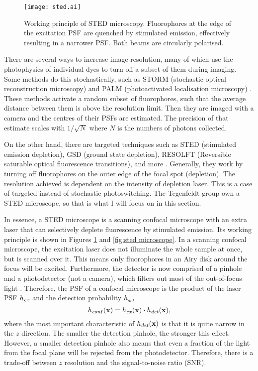 \begin{figure}
	\centering
	\texttt{[image: sted.ai]}
	\caption{
		Working principle of STED microscopy. Fluorophores at the edge of the excitation PSF are quenched by stimulated emission, effectively resulting in a narrower PSF. Both beams are circularly polarised. 
	}
	\label{fig:sted principle}
\end{figure}

There are several ways to increase image resolution, many of which use the photophysics of individual dyes to turn off a subset of them during imaging. Some methods do this stochastically, such as STORM (stochastic optical reconstruction microscopy) and PALM (photoactivated localisation microscopy) \cite{Mock2009, Betzig2006}. These methods activate a random subset of fluorophores, such that the average distance between them is above the resolution limit. Then they are imaged with a camera and the centres of their PSFs are estimated. The precision of that estimate scales with $ 1/\sqrt{N} $ where $ N $ is the numbers of photons collected.

On the other hand, there are targeted techniques such as STED (stimulated emission depletion), GSD (ground state depletion), RESOLFT (Reversible saturable optical fluorescence transitions), and more \cite{Klar2000, Folling2008, Hofmann2005}. Generally, they work by turning off fluorophores on the outer edge of the focal spot (depletion). The resolution achieved is dependent on the intensity of depletion laser. This is a case of targeted instead of stochastic photoswitching. The Tegenfeldt group own a STED microscope, so that is what I will focus on in this section. 

In essence, a STED microscope is a scanning confocal microscope with an extra laser that can selectively deplete fluorescence by stimulated emission. Its working principle is shown in Figures \ref{fig:sted principle} and \ref{fig:sted microscope}. In a scanning confocal microscope, the excitation laser does not illuminate the whole sample at once, but is scanned over it. This means only fluorophores in an Airy disk around the focus will be excited. Furthermore, the detector is now comprised of a pinhole and a photodetector (not a camera), which filters out most of the out-of-focus light \cite{Minsky1957}. Therefore, the PSF of a confocal microscope is the product of the laser PSF $ h_{\mathit{ex}} $ and the detection probability $ h_\mathit{det} $
\begin{equation}
	h_\mathit{conf}(\vb{x}) = h_{\mathit{ex}}(\vb{x}) \cdot h_\mathit{det}(\vb{x}),
\end{equation}
where the most important characteristic of $ h_\mathit{det}(\vb{x}) $ is that it is quite narrow in the $ z $ direction. The smaller the detection pinhole, the stronger this effect. However, a smaller detection pinhole also means that even a fraction of the light from the focal plane will be rejected from the photodetector. Therefore, there is a trade-off between $ z $ resolution and the signal-to-noise ratio (SNR).

